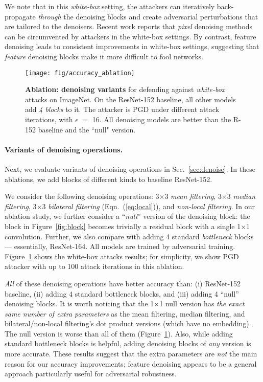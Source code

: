 \documentclass[10pt,twocolumn,letterpaper]{article}
\begin{document}
We note that in this \emph{white-box} setting, the attackers can iteratively back-propagate \emph{through} the denoising blocks and create adversarial perturbations that are tailored to the denoisers. 
Recent work \cite{Athalye2018} reports that \emph{pixel} denoising methods can be circumvented by attackers in the white-box settings. 
By contrast, feature denoising leads to consistent improvements in white-box settings, suggesting that \emph{feature} denoising blocks make it more difficult to fool networks.

\begin{figure}[tp!]
\centering
\vspace{-.5em}
\texttt{[image: fig/accuracy\_ablation]}
\vspace{-1.8em}
\caption{\textbf{Ablation: denoising variants} for defending against \emph{white-box} attacks on ImageNet.
On the ResNet-152 baseline, all other models add \emph{4 blocks} to it.
The attacker is PGD under different attack iterations, with $\epsilon$ $=$ 16.
All denoising models are better than the R-152 baseline and the ``null" version.
}
\label{fig:accuracy_ablation}
\vspace{-1.5em}
\end{figure}


\paragraph{Variants of denoising operations.} Next, we evaluate variants of denoising operations in Sec.~\ref{sec:denoise}. In these ablations, we add blocks of different kinds to baseline ResNet-152.

We consider the following denoising operations: 3$\times$3 \emph{mean filtering}, 3$\times$3 \emph{median filtering}, 3$\times$3 \emph{bilateral filtering} (Eqn.~(\ref{eq:local})), and \emph{non-local filtering}.
In our ablation study, we further consider a ``\emph{null}'' version of the denoising block: the block in Figure~\ref{fig:block} becomes trivially a residual block with a single 1$\times$1 convolution.
Further, we also compare with adding 4 standard \emph{bottleneck} \cite{He2016} blocks --- essentially, ResNet-164.
All models are trained by adversarial training.
Figure~\ref{fig:accuracy_ablation} shows the white-box attacks results; for simplicity, we show PGD attacker with up to 100 attack iterations in this ablation.

\emph{All} of these denoising operations have better accuracy than: (i) ResNet-152 baseline, (ii) adding 4 standard bottleneck blocks, and (iii) adding 4 ``null'' denoising blocks. It is worth noticing that the 1$\times$1 null version has \emph{the exact same number of extra parameters} as the mean filtering, median filtering, and bilateral/non-local filtering's dot product versions (which have no embedding).
The null version is worse than all of them (Figure~\ref{fig:accuracy_ablation}).
Also, while adding standard bottleneck blocks is helpful, adding denoising blocks of \emph{any} version is more accurate.
These results suggest that the extra parameters are \emph{not} the main reason for our accuracy improvements; feature denoising appears to be a general approach particularly useful for adversarial robustness.
\end{document}

